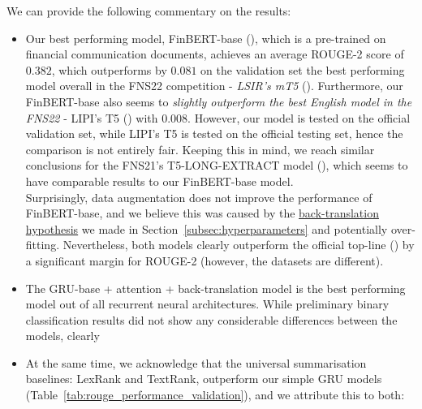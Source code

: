 We can provide the following commentary on the results:
\begin{itemize}
    \item Our best performing model, FinBERT-base (\cite{yang2020finbert}), which is a pre-trained on financial communication documents,
        achieves an average ROUGE-2 score of $0.382$, which outperforms by $0.081$ on the validation set the best performing
        model overall in the FNS22 competition - \emph{LSIR's mT5} (\cite{foroutan-etal-2022-multilingual}).
        Furthermore, our FinBERT-base also seems to \emph{slightly outperform the best English model in the FNS22} - LIPI's T5 (\cite{el-haj-etal-2022-financial}) with $0.008$.
        However, our model is tested on the official validation set, while LIPI's T5 is tested on the official testing set, hence the comparison is not entirely fair.
        Keeping this in mind, we reach similar conclusions for the FNS21's T5-LONG-EXTRACT model (\cite{orzhenovskii-2021-t5}), which seems to have comparable results to our FinBERT-base model. \\
        Surprisingly, data augmentation does not improve the performance of FinBERT-base, and we believe this was caused by
        the \hyperlink{data_augment_hypothesis}{back-translation hypothesis} we made in Section~\ref{subsec:hyperparameters} and potentially over-fitting.
        Nevertheless, both models clearly outperform the official top-line (\cite{litvak-last-2013-multilingual}) by a significant margin for ROUGE-2 (however, the datasets are different).
    \item The GRU-base + attention + back-translation model is the best performing model out of all recurrent neural architectures.
    While preliminary binary classification results did not show any considerable differences between the models, clearly
    \item At the same time, we acknowledge that the universal summarisation baselines: LexRank and TextRank, outperform
        our simple GRU models (Table~\ref{tab:rouge_performance_validation}), and we attribute this to both:

\end{itemize}
